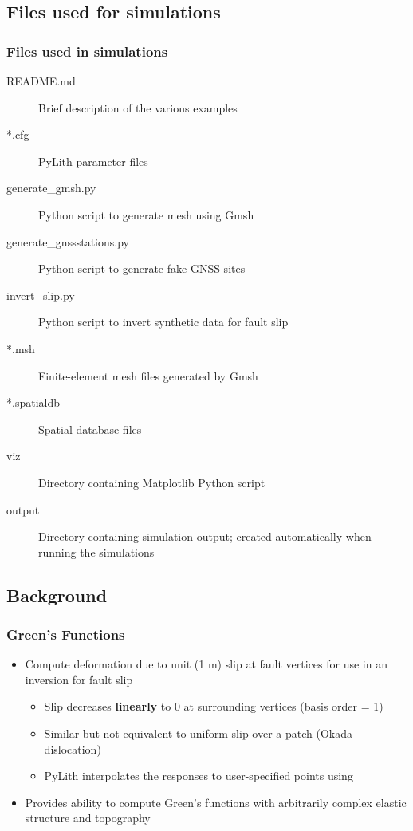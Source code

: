\documentclass[aspectratio=169]{beamer}
\begin{document}
\subsection{Files used for simulations}

\begin{frame}
  \frametitle{Files used in simulations}

  \begin{description}
  \item[README.md] Brief description of the various examples
  \item[*.cfg] PyLith parameter files
  \item[generate\_gmsh.py] Python script to generate mesh using Gmsh
  \item[generate\_gnssstations.py] Python script to generate fake GNSS sites
  \item[invert\_slip.py] Python script to invert synthetic data for fault slip
  \item[*.msh] Finite-element mesh files generated by Gmsh
  \item[*.spatialdb] Spatial database files
  \item[viz] Directory containing Matplotlib Python script
  \item[output] Directory containing simulation output; created automatically when running the simulations
  \end{description}

\end{frame}

\subsection{Background}

\begin{frame}
  \frametitle{Green's Functions}
  \summary{}

  \begin{itemize}
  \item Compute deformation due to unit (1 m) slip at fault vertices for use in an inversion for fault slip
    \begin{itemize}
    \item Slip decreases {\bf linearly} to 0 at surrounding vertices (basis order = 1)
    \item Similar but not equivalent to uniform slip over a patch (Okada dislocation)
    \item PyLith interpolates the responses to user-specified points using 
    \end{itemize}
  \item Provides ability to compute Green's functions with arbitrarily complex elastic structure and topography
  \end{itemize}
  
\end{frame}
\end{document}
